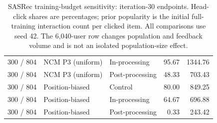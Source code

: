 \begin{table}[htbp!]
\begin{tabular}{lllrr}
300 / 804 & NCM P3 (uniform) & In-processing & 95.67 & 1344.76 \\
300 / 804 & NCM P3 (uniform) & Post-processing & 48.33 & 703.43 \\
300 / 804 & Position-biased & Control & 80.00 & 849.25 \\
300 / 804 & Position-biased & In-processing & 64.67 & 696.88 \\
300 / 804 & Position-biased & Post-processing & 0.33 & 243.42 \\
\hline
\end{tabular}
\caption{SASRec training-budget sensitivity: iteration-30 endpoints. Head-click shares are percentages; prior popularity is the initial full-training interaction count per clicked item. All comparisons use seed 42. The 6,040-user row changes population and feedback volume and is not an isolated population-size effect.}
\label{chap:results:tab:appendix_epoch_budget_endpoint}
\end{table}
